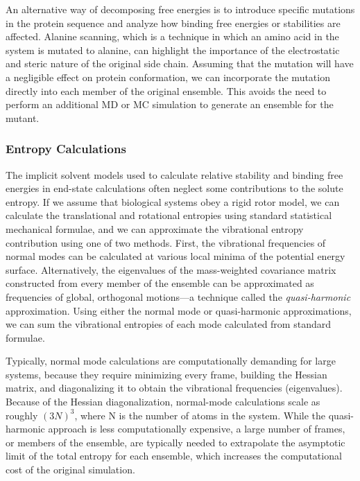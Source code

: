 An alternative way of decomposing free energies is to introduce specific
mutations in the protein sequence and analyze how binding free energies or
stabilities are affected. \cite{Massova2000} Alanine scanning, which is a
technique in which an amino acid in the system is mutated to alanine, can
highlight the importance of the electrostatic and steric nature of the original
side chain. \cite{Massova1999} Assuming that the mutation will have a negligible
effect on protein conformation, we can incorporate the mutation directly into
each member of the original ensemble. This avoids the need to perform an
additional MD or MC simulation to generate an ensemble for the mutant.

\subsubsection{Entropy Calculations}

The implicit solvent models used to calculate relative stability and binding
free energies in end-state calculations often neglect some contributions to the
solute entropy. If we assume that biological systems obey a rigid rotor model,
we can calculate the translational and rotational entropies using standard
statistical mechanical formulae, \cite{McQuarrie_Book_StatMech_1973} and we can
approximate the vibrational entropy contribution using one of two methods.
First, the vibrational frequencies of normal modes can be calculated at various
local minima of the potential energy surface.
\cite{McQuarrie_Book_StatMech_1973} Alternatively, the eigenvalues of the
mass-weighted covariance matrix constructed from every member of the ensemble
can be approximated as frequencies of global, orthogonal motions---a technique
called the \emph{quasi-harmonic} approximation.
\cite{Brooks_JComputChem_1995_v16_p1522} Using either the normal mode or
quasi-harmonic approximations, we can sum the vibrational entropies of each mode
calculated from standard formulae. \cite{McQuarrie_Book_StatMech_1973}

Typically, normal mode calculations are computationally demanding for large
systems, because they require minimizing every frame, building the Hessian
matrix, and diagonalizing it to obtain the vibrational frequencies
(eigenvalues). Because of the Hessian diagonalization, normal-mode calculations
scale as roughly $(3N)^3$, where N is the number of atoms in the system. While the
quasi-harmonic approach is less computationally expensive, a large number of
frames, or members of the ensemble, are typically needed to extrapolate the
asymptotic limit of the total entropy for each ensemble, which increases the
computational cost of the original simulation. \cite{Wang2001}

